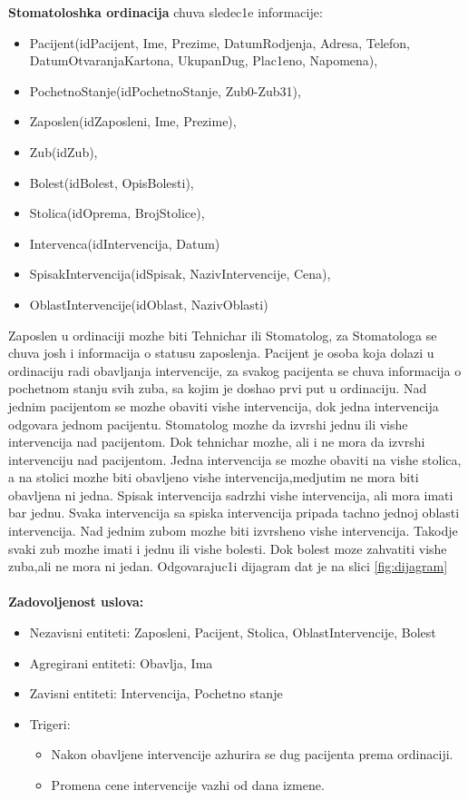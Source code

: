 \documentclass[10 pt]{article}
\begin{document}
\textbf{Stomatoloshka ordinacija} chuva sledec1e informacije:
\begin{itemize} 
	\item Pacijent(idPacijent, Ime, Prezime, DatumRodjenja, Adresa, Telefon, DatumOtvaranjaKartona, UkupanDug, Plac1eno, Napomena),
	\item PochetnoStanje(idPochetnoStanje, Zub0-Zub31),
	\item Zaposlen(idZaposleni, Ime, Prezime), 
	\item Zub(idZub), 
	\item Bolest(idBolest, OpisBolesti),
	\item Stolica(idOprema, BrojStolice), 
	\item Intervenca(idIntervencija, Datum) 
	\item SpisakIntervencija(idSpisak, NazivIntervencije, Cena),
	\item OblastIntervencije(idOblast, NazivOblasti)
\end{itemize}
Zaposlen u ordinaciji mozhe biti Tehnichar ili Stomatolog, za Stomatologa se chuva josh i informacija o statusu zaposlenja. Pacijent je osoba koja dolazi u ordinaciju radi obavljanja intervencije, za svakog pacijenta se chuva informacija o pochetnom stanju svih zuba, sa kojim je doshao prvi put u ordinaciju. Nad jednim pacijentom se mozhe obaviti vishe intervencija, dok jedna intervencija odgovara jednom pacijentu. Stomatolog mozhe da izvrshi jednu ili vishe intervencija nad pacijentom. Dok tehnichar mozhe, ali i ne mora da izvrshi intervenciju nad pacijentom. Jedna intervencija se mozhe obaviti na vishe stolica, a na stolici mozhe biti obavljeno vishe intervencija,medjutim ne mora biti obavljena ni jedna. Spisak intervencija sadrzhi vishe intervencija, ali mora imati bar jednu. Svaka intervencija sa spiska intervencija pripada tachno jednoj oblasti intervencija. Nad jednim zubom mozhe biti izvrsheno vishe intervencija. Takodje svaki zub mozhe imati i jednu ili vishe bolesti. Dok bolest moze zahvatiti vishe zuba,ali ne mora ni jedan. Odgovarajuc1i dijagram dat je na slici \ref{fig:dijagram}
\\
\\
\textbf{Zadovoljenost uslova:}
\begin{itemize}
	\item Nezavisni entiteti: Zaposleni, Pacijent, Stolica, OblastIntervencije, Bolest
	\item Agregirani entiteti: Obavlja, Ima
	\item Zavisni entiteti: Intervencija, Pochetno stanje
	\item Trigeri: 
		\begin{itemize}
			\item Nakon obavljene intervencije azhurira se dug pacijenta prema ordinaciji.
			\item Promena cene intervencije vazhi od dana izmene.
		\end{itemize}	
\end{itemize}
\end{document}
